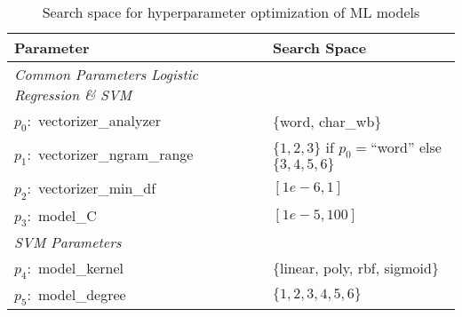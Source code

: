 \begin{table}[!ht]
	\centering
	\begin{tabular}{lm{6cm}}
		\toprule
		\textbf{Parameter} & \textbf{Search Space} \\
		\midrule
		\emph{Common Parameters Logistic Regression \& SVM} & \\
		\cmidrule(r){1-2}
		$p_0:$ vectorizer\_analyzer & $\{$word, char\_wb$\}$ \\
		$p_1:$ vectorizer\_ngram\_range & $\{1,2,3\}$ if $p_0=$``word'' else $\{3,4,5,6\}$ \\
		$p_2:$ vectorizer\_min\_df & $[1e-6, 1]$\\
		$p_3:$ model\_C & $[1e-5, 100]$ \\
		\midrule
		\emph{SVM Parameters} & \\
		\cmidrule(r){1-2}
		$p_4:$ model\_kernel & $\{$linear, poly, rbf, sigmoid$\}$ \\
		$p_5:$ model\_degree & $\{1,2,3,4,5,6\}$ \\
		\bottomrule
	\end{tabular}
	\caption{Search space for hyperparameter optimization of ML models}
	\label{table-searchspace}
\end{table}
